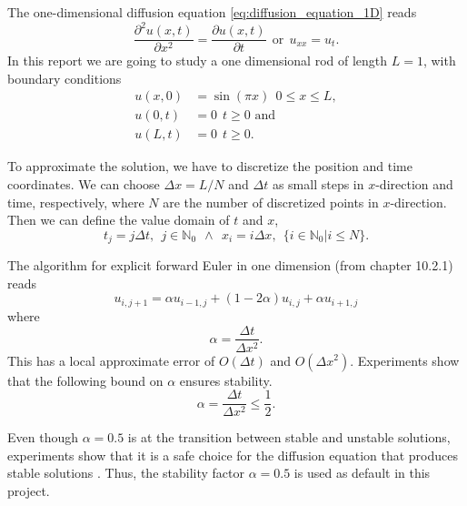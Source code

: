 \documentclass[12pt]{extarticle}
\begin{document}
The one-dimensional diffusion equation \eqref{eq:diffusion_equation_1D} reads 
\begin{equation}
\frac{\partial^2u(x, t)}{\partial x^2} = \frac{\partial u(x,t)}{\partial t} \ \ \text{or} \ \ u_{xx} = u_t.
\end{equation}
In this report we are going to study a one dimensional rod of length $L=1$, with boundary conditions
\begin{align}
	u(x,0) &= \sin(\pi x) \ \ 0\leq x\leq L,\\
	u(0,t) &= 0 \ \ t\geq 0 \text{ and} \\
	u(L,t) &= 0 \ \ t\geq 0.
\end{align}

To approximate the solution, we have to discretize the position and time coordinates. We can choose  $\Delta x = L/N$ and $\Delta t$ as small steps in $x$-direction and time, respectively, where $N$ are the number of discretized points in $x$-direction. Then we can define the value domain of $t$ and $x$,
\begin{equation*}
t_j = j\Delta t, \ \ j\in \mathbb{N}_0 \ \ \wedge \ \ x_i = i\Delta x, \ \ \{i \in \mathbb{N}_0 | i \leq N\}.
\end{equation*}

The algorithm for explicit forward Euler in one dimension (from \cite{lectures2015} chapter 10.2.1) reads
\begin{equation}
\label{eq:forward_euler}
u_{i, j+1} = \alpha u_{i-1, j} + (1 - 2\alpha) u_{i,j} + \alpha u_{i+1, j}
\end{equation}
where
\begin{equation*}
\alpha = \frac{\Delta t}{\Delta x^2}.
\end{equation*}
This has a local approximate error of $O(\Delta t)$ and $O(\Delta x ^2)$. Experiments show that the following bound on $\alpha$ ensures stability.
\begin{equation}
	\label{eq:stability}
	\alpha = \frac{\Delta t}{\Delta x^2} \le \frac{1}{2}.
\end{equation} 

Even though $\alpha = 0.5$ is at the transition between stable and unstable solutions, experiments show that it is a safe choice for the diffusion equation that produces stable solutions \cite{Linge2017}. Thus, the stability factor $\alpha=0.5$ is used as default in this project. 
\end{document}
